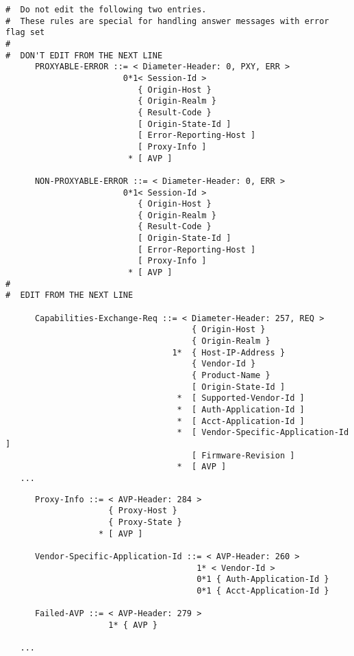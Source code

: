 \begin{verbatim}
#  Do not edit the following two entries.
#  These rules are special for handling answer messages with error flag set
#
#  DON'T EDIT FROM THE NEXT LINE
      PROXYABLE-ERROR ::= < Diameter-Header: 0, PXY, ERR >
                        0*1< Session-Id >
                           { Origin-Host }
                           { Origin-Realm }
                           { Result-Code }
                           [ Origin-State-Id ]
                           [ Error-Reporting-Host ]
                           [ Proxy-Info ]
                         * [ AVP ]

      NON-PROXYABLE-ERROR ::= < Diameter-Header: 0, ERR >
                        0*1< Session-Id >
                           { Origin-Host }
                           { Origin-Realm }
                           { Result-Code }
                           [ Origin-State-Id ]
                           [ Error-Reporting-Host ]
                           [ Proxy-Info ]
                         * [ AVP ]
#  
#  EDIT FROM THE NEXT LINE

      Capabilities-Exchange-Req ::= < Diameter-Header: 257, REQ >
                                      { Origin-Host }
                                      { Origin-Realm }
                                  1*  { Host-IP-Address }
                                      { Vendor-Id }
                                      { Product-Name }
                                      [ Origin-State-Id ]
                                   *  [ Supported-Vendor-Id ]
                                   *  [ Auth-Application-Id ]
                                   *  [ Acct-Application-Id ]
                                   *  [ Vendor-Specific-Application-Id ]
                                      [ Firmware-Revision ]
                                   *  [ AVP ]
   ...
\end{verbatim}
\clearpage

\begin{verbatim}
      Proxy-Info ::= < AVP-Header: 284 >
                     { Proxy-Host }
                     { Proxy-State }
                   * [ AVP ]

      Vendor-Specific-Application-Id ::= < AVP-Header: 260 >
                                       1* < Vendor-Id >
                                       0*1 { Auth-Application-Id }
                                       0*1 { Acct-Application-Id }

      Failed-AVP ::= < AVP-Header: 279 >
                     1* { AVP }

   ...
\end{verbatim}
\clearpage

